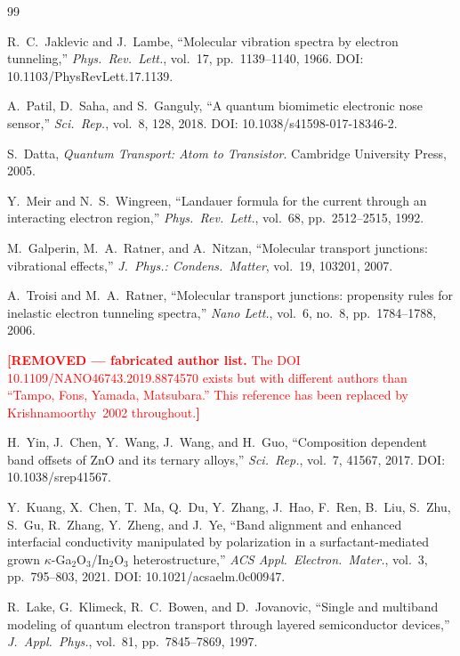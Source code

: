 \documentclass[11pt,a4paper,onecolumn]{article}
\begin{document}
\begin{thebibliography}{99}

 R.~C.~Jaklevic and J.~Lambe, ``Molecular vibration
spectra by electron tunneling,'' \textit{Phys.\ Rev.\ Lett.}, vol.~17,
pp.~1139--1140, 1966. DOI: 10.1103/PhysRevLett.17.1139.

 A.~Patil, D.~Saha, and S.~Ganguly, ``A quantum
biomimetic electronic nose sensor,'' \textit{Sci.\ Rep.}, vol.~8, 128,
2018. DOI: 10.1038/s41598-017-18346-2.

 S.~Datta, \textit{Quantum Transport: Atom to Transistor}.
Cambridge University Press, 2005.

 Y.~Meir and N.~S.~Wingreen, ``Landauer formula for the
current through an interacting electron region,'' \textit{Phys.\ Rev.\
Lett.}, vol.~68, pp.~2512--2515, 1992.

 M.~Galperin, M.~A.~Ratner, and A.~Nitzan,
``Molecular transport junctions: vibrational effects,''
\textit{J.\ Phys.: Condens.\ Matter}, vol.~19, 103201, 2007.

 A.~Troisi and M.~A.~Ratner, ``Molecular transport
junctions: propensity rules for inelastic electron tunneling spectra,''
\textit{Nano Lett.}, vol.~6, no.~8, pp.~1784--1788, 2006.

 \textcolor{red}{\textbf{[REMOVED --- fabricated author list.}
The DOI 10.1109/NANO46743.2019.8874570 exists but with different authors than
``Tampo, Fons, Yamada, Matsubara.'' This reference has been replaced by
Krishnamoorthy~2002 throughout.\textbf{]}}

 H.~Yin, J.~Chen, Y.~Wang, J.~Wang, and H.~Guo,
``Composition dependent band offsets of ZnO and its ternary alloys,''
\textit{Sci.\ Rep.}, vol.~7, 41567, 2017. DOI: 10.1038/srep41567.

 Y.~Kuang, X.~Chen, T.~Ma, Q.~Du, Y.~Zhang, J.~Hao,
F.~Ren, B.~Liu, S.~Zhu, S.~Gu, R.~Zhang, Y.~Zheng, and J.~Ye, ``Band
alignment and enhanced interfacial conductivity manipulated by polarization
in a surfactant-mediated grown $\kappa$-Ga$_2$O$_3$/In$_2$O$_3$
heterostructure,'' \textit{ACS Appl.\ Electron.\ Mater.}, vol.~3,
pp.~795--803, 2021. DOI: 10.1021/acsaelm.0c00947.

 R.~Lake, G.~Klimeck, R.~C.~Bowen, and D.~Jovanovic,
``Single and multiband modeling of quantum electron transport through
layered semiconductor devices,'' \textit{J.\ Appl.\ Phys.}, vol.~81,
pp.~7845--7869, 1997.


\end{thebibliography}
\end{document}
